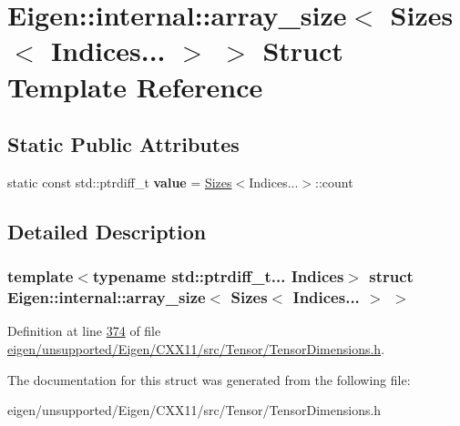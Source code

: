 \hypertarget{struct_eigen_1_1internal_1_1array__size_3_01_sizes_3_01_indices_8_8_8_01_4_01_4}{}\section{Eigen\+:\+:internal\+:\+:array\+\_\+size$<$ Sizes$<$ Indices... $>$ $>$ Struct Template Reference}
\label{struct_eigen_1_1internal_1_1array__size_3_01_sizes_3_01_indices_8_8_8_01_4_01_4}
\subsection*{Static Public Attributes}
\begin{DoxyCompactItemize}
\item 
\mbox{\label{struct_eigen_1_1internal_1_1array__size_3_01_sizes_3_01_indices_8_8_8_01_4_01_4_a20bc6ea9710e29f8afd3d273cb15ca1b}} 
static const std\+::ptrdiff\+\_\+t {\bfseries value} = \hyperlink{struct_eigen_1_1_sizes}{Sizes}$<$Indices...$>$\+::count
\end{DoxyCompactItemize}


\subsection{Detailed Description}
\subsubsection*{template$<$typename std\+::ptrdiff\+\_\+t... Indices$>$\newline
struct Eigen\+::internal\+::array\+\_\+size$<$ Sizes$<$ Indices... $>$ $>$}



Definition at line \hyperlink{eigen_2unsupported_2_eigen_2_c_x_x11_2src_2_tensor_2_tensor_dimensions_8h_source_l00374}{374} of file \hyperlink{eigen_2unsupported_2_eigen_2_c_x_x11_2src_2_tensor_2_tensor_dimensions_8h_source}{eigen/unsupported/\+Eigen/\+C\+X\+X11/src/\+Tensor/\+Tensor\+Dimensions.\+h}.



The documentation for this struct was generated from the following file\+:\begin{DoxyCompactItemize}
\item 
eigen/unsupported/\+Eigen/\+C\+X\+X11/src/\+Tensor/\+Tensor\+Dimensions.\+h\end{DoxyCompactItemize}
